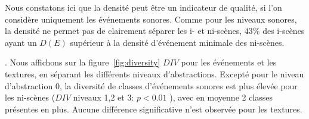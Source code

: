 Nous constatons ici que la densité peut être un indicateur de qualité, si l'on considère uniquement les événements sonores. Comme pour les niveaux sonores, la densité ne permet pas de clairement séparer les i- et ni-scènes,  $43\%$ des i-scènes ayant un $D(E)$ supérieur à la densité d'événement minimale des ni-scènes.

 . Nous affichons sur la figure~\ref{fig:diversity} $DIV$ pour les événements et les textures, en séparant les différents niveaux d'abstractions. Excepté pour le niveau d'abstraction 0, la diversité de classes d'événements sonores est plus élevée pour les ni-scènes ($DIV$ niveaux 1,2 et 3: $p<0.01$ ), avec en moyenne 2 classes présentes en plus. Aucune différence significative n'est observée pour les textures.

